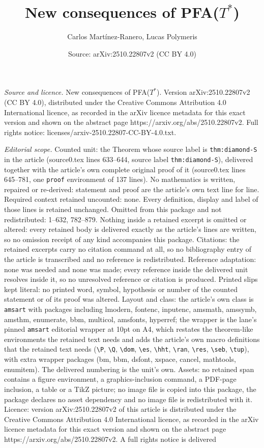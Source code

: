 \documentclass[10pt,a4paper]{amsart}
\title[New consequences of PFA($T^*$)]{New consequences of PFA($T^*$)}
\author{Carlos Mart\'inez-Ranero, Lucas Polymeris}
\date{Source: arXiv:2510.22807v2 (CC BY 4.0)}
\begin{document}
\maketitle

\noindent\emph{Source and licence.} New consequences of PFA($T^*$). Version arXiv:2510.22807v2 (CC BY 4.0), distributed under the Creative Commons Attribution 4.0 International licence, as recorded in the arXiv licence metadata for this exact version and shown on the abstract page https://arxiv.org/abs/2510.22807v2. Full rights notice: licenses/arxiv-2510.22807-CC-BY-4.0.txt.\par\smallskip

\noindent\textit{Editorial scope.} Counted unit: the Theorem whose source label is \texttt{thm:diamond-S} in the article (source0.tex lines 633--644, source label \texttt{thm:diamond-S}), delivered together with the article's own complete original proof of it (source0.tex lines 645--781, one \texttt{proof} environment of 137 lines). No mathematics is written, repaired or re-derived: statement and proof are the article's own text line for line. Required context retained uncounted: none. Every definition, display and label of those lines is retained unchanged. Omitted from this package and not redistributed: 1--632, 782--879. Nothing inside a retained excerpt is omitted or altered: every retained body is delivered exactly as the article's lines are written, so no omission receipt of any kind accompanies this package. Citations: the retained excerpts carry no citation command at all, so no bibliography entry of the article is transcribed and no reference is redistributed. Reference adaptation: none was needed and none was made; every reference inside the delivered unit resolves inside it, so no unresolved reference or citation is produced. Printed slips kept literal: no printed word, symbol, hypothesis or number of the counted statement or of its proof was altered. Layout and class: the article's own class is \texttt{amsart} with packages including lmodern, fontenc, inputenc, amsmath, amssymb, amsthm, enumerate, bbm, multicol, amsfonts, hyperref; the wrapper is the lane's pinned \texttt{amsart} editorial wrapper at 10pt on A4, which restates the theorem-like environments the retained text needs and adds the article's own macro definitions that the retained text needs (\texttt{\textbackslash P}, \texttt{\textbackslash Q}, \texttt{\textbackslash dom}, \texttt{\textbackslash es}, \texttt{\textbackslash hht}, \texttt{\textbackslash ran}, \texttt{\textbackslash res}, \texttt{\textbackslash seb}, \texttt{\textbackslash tup}), with extra wrapper packages (bm, bbm, dsfont, xspace, cancel, mathtools, enumitem). The delivered numbering is the unit's own. Assets: no retained span contains a figure environment, a graphics-inclusion command, a PDF-page inclusion, a table or a TikZ picture; no image file is copied into this package, the package declares no asset dependency and no image file is redistributed with it. Licence: version arXiv:2510.22807v2 of this article is distributed under the Creative Commons Attribution 4.0 International licence, as recorded in the arXiv licence metadata for this exact version and shown on the abstract page https://arxiv.org/abs/2510.22807v2. A full rights notice is delivered 
\end{document}
